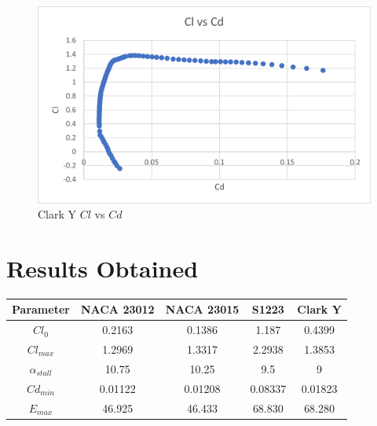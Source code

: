 \documentclass{article}
\begin{document}
\begin{figure}[!h]
\begin{center}
	\includegraphics[scale=0.7]{ClarkY ClCd.png}
	\caption{Clark Y $Cl$ vs $Cd$}
	\label{Figure12:}
\end{center}
\end{figure}

\newpage
\section{Results Obtained}
\begin{tabular}[pos]{| c | c | c | c | c |}
\hline
Parameter & NACA 23012 & NACA 23015 & S1223 & Clark Y\\ \hline
$Cl_{0}$ & 0.2163 & 0.1386 & 1.187 & 0.4399   \\ \hline
$Cl_{max}$  & 1.2969 & 1.3317 & 2.2938 & 1.3853 \\ \hline
$\alpha_{stall}$ & 10.75 & 10.25 & 9.5 & 9 \\ \hline
$Cd_{min}$ & 0.01122 & 0.01208 & 0.08337 & 0.01823 \\ \hline
$E_{max}$ & 46.925 & 46.433 & 68.830 & 68.280 \\ \hline
\end{tabular}
\end{document}
